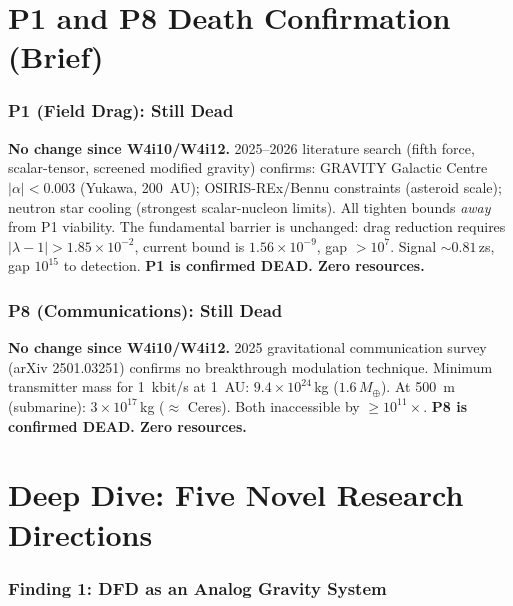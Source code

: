 \documentclass[11pt]{article}
\newcommand{\ee}[1]{\times 10^{#1}}
\newcommand{\lamdiff}{|\lambda{-}1|}
\begin{document}
\part{P1 and P8 Death Confirmation (Brief)}

\section{P1 (Field Drag): Still Dead}

\textbf{No change since W4i10/W4i12.} 2025--2026 literature search
(fifth force, scalar-tensor, screened modified gravity) confirms:
GRAVITY Galactic Centre $|\alpha| < 0.003$ (Yukawa, 200~AU);
OSIRIS-REx/Bennu constraints (asteroid scale); neutron star cooling
(strongest scalar-nucleon limits). All tighten bounds \emph{away} from
P1 viability. The fundamental barrier is unchanged: drag reduction
requires $\lamdiff > 1.85\ee{-2}$, current bound is $1.56\ee{-9}$,
gap $> 10^7$. Signal $\sim 0.81\,$zs, gap $10^{15}$ to detection.
\textbf{P1 is confirmed DEAD. Zero resources.}


\section{P8 (Communications): Still Dead}

\textbf{No change since W4i10/W4i12.} 2025 gravitational communication
survey (arXiv 2501.03251) confirms no breakthrough modulation technique.
Minimum transmitter mass for 1~kbit/s at 1~AU: $9.4\ee{24}\,$kg
($1.6\,M_\oplus$). At 500~m (submarine): $3\ee{17}\,$kg ($\approx$
Ceres). Both inaccessible by $\geq 10^{11}\times$.
\textbf{P8 is confirmed DEAD. Zero resources.}


\part{Deep Dive: Five Novel Research Directions}

\section{Finding 1: DFD as an Analog Gravity System}
\label{sec:analog}
\end{document}
